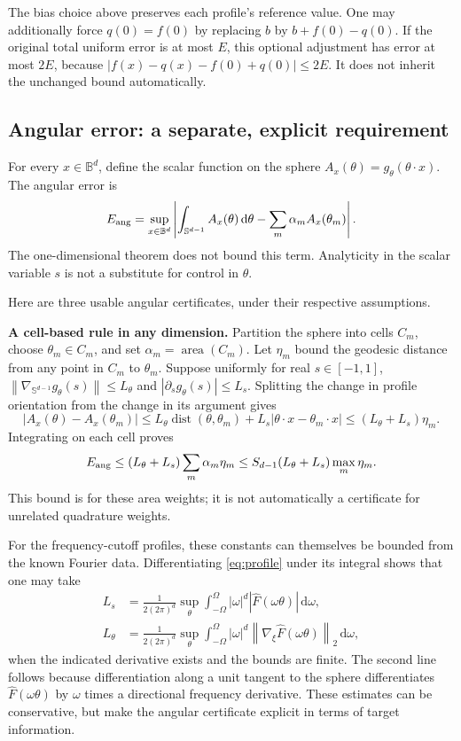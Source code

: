 \documentclass[11pt]{article}
\newcommand{\Sph}{\mathbb S^{d-1}}
\newcommand{\dd}{\,\mathrm d}
\newcommand{\norm}[1]{\left\lVert#1\right\rVert}
\begin{document}
The bias choice above preserves each profile's reference value. One may additionally force $q(0)=f(0)$ by replacing $b$ by $b+f(0)-q(0)$. If the original total uniform error is at most $E$, this optional adjustment has error at most $2E$, because
$|f(x)-q(x)-f(0)+q(0)|\le2E$. It does not inherit the unchanged bound automatically.

\subsection{Angular error: a separate, explicit requirement}

For every $x\in\mathbb B^d$, define the scalar function on the sphere
$A_x(\theta)=g_\theta(\theta\cdot x)$. The angular error is
\begin{equation}
 E_{\rm ang}=\sup_{x\in\mathbb B^d}
 \left|\int_{\Sph}A_x(\theta)\dd\theta
 -\sum_m\alpha_m A_x(\theta_m)\right|.
 \label{eq:angular-error}
\end{equation}
The one-dimensional theorem does not bound this term. Analyticity in the scalar variable $s$ is not a substitute for control in $\theta$.

Here are three usable angular certificates, under their respective assumptions.

\textbf{A cell-based rule in any dimension.} Partition the sphere into cells $C_m$, choose $\theta_m\in C_m$, and set $\alpha_m=\operatorname{area}(C_m)$. Let $\eta_m$ bound the geodesic distance from any point in $C_m$ to $\theta_m$. Suppose uniformly for real $s\in[-1,1]$,
$\norm{\nabla_{\Sph}g_\theta(s)}\le L_\theta$ and
$|\partial_sg_\theta(s)|\le L_s$. Splitting the change in profile orientation from the change in its argument gives
\[
 |A_x(\theta)-A_x(\theta_m)|
 \le L_\theta\operatorname{dist}(\theta,\theta_m)
 +L_s|\theta\cdot x-\theta_m\cdot x|
 \le(L_\theta+L_s)\eta_m.
\]
Integrating on each cell proves
\begin{equation}
 E_{\rm ang}\le(L_\theta+L_s)\sum_m\alpha_m\eta_m
 \le S_{d-1}(L_\theta+L_s)\max_m\eta_m.
 \label{eq:angular-cell-bound}
\end{equation}
This bound is for these area weights; it is not automatically a certificate for unrelated quadrature weights.

For the frequency-cutoff profiles, these constants can themselves be bounded from the known Fourier data. Differentiating \eqref{eq:profile} under its integral shows that one may take
\begin{align*}
 L_s&=\frac1{2(2\pi)^d}\sup_\theta\int_{-\Omega}^{\Omega}
 |\omega|^d|\widehat F(\omega\theta)|\dd\omega,\\
 L_\theta&=\frac1{2(2\pi)^d}\sup_\theta\int_{-\Omega}^{\Omega}
 |\omega|^d\norm{\nabla_\xi\widehat F(\omega\theta)}_2\dd\omega,
\end{align*}
when the indicated derivative exists and the bounds are finite. The second line follows because differentiation along a unit tangent to the sphere differentiates $\widehat F(\omega\theta)$ by $\omega$ times a directional frequency derivative. These estimates can be conservative, but make the angular certificate explicit in terms of target information.
\end{document}

